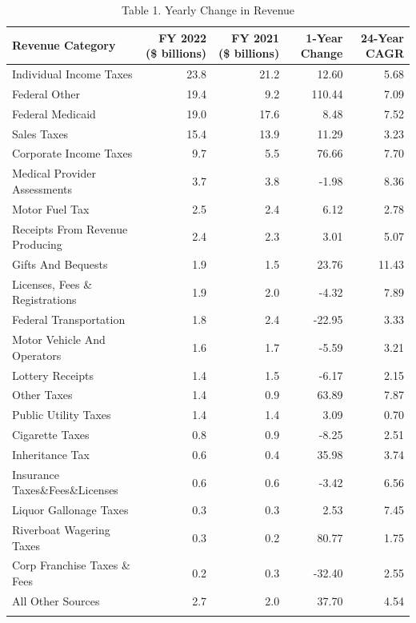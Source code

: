 \documentclass[
  letterpaper,
  DIV=11,
  numbers=noendperiod]{scrreport}
\begin{document}
\begin{table}

\caption{Table 1. Yearly Change in Revenue}
\centering
\begin{tabular}[t]{l|r|r|r|r}
\hline
Revenue Category & FY 2022 (\$ billions) & FY 2021 (\$ billions) & 1-Year Change & 24-Year CAGR\\
\hline
Individual Income Taxes & 23.8 & 21.2 & 12.60 & 5.68\\
\hline
Federal Other & 19.4 & 9.2 & 110.44 & 7.09\\
\hline
Federal Medicaid & 19.0 & 17.6 & 8.48 & 7.52\\
\hline
Sales Taxes & 15.4 & 13.9 & 11.29 & 3.23\\
\hline
Corporate Income Taxes & 9.7 & 5.5 & 76.66 & 7.70\\
\hline
Medical Provider Assessments & 3.7 & 3.8 & -1.98 & 8.36\\
\hline
Motor Fuel Tax & 2.5 & 2.4 & 6.12 & 2.78\\
\hline
Receipts From Revenue Producing & 2.4 & 2.3 & 3.01 & 5.07\\
\hline
Gifts And Bequests & 1.9 & 1.5 & 23.76 & 11.43\\
\hline
Licenses, Fees \& Registrations & 1.9 & 2.0 & -4.32 & 7.89\\
\hline
Federal Transportation & 1.8 & 2.4 & -22.95 & 3.33\\
\hline
Motor Vehicle And Operators & 1.6 & 1.7 & -5.59 & 3.21\\
\hline
Lottery Receipts & 1.4 & 1.5 & -6.17 & 2.15\\
\hline
Other Taxes & 1.4 & 0.9 & 63.89 & 7.87\\
\hline
Public Utility Taxes & 1.4 & 1.4 & 3.09 & 0.70\\
\hline
Cigarette Taxes & 0.8 & 0.9 & -8.25 & 2.51\\
\hline
Inheritance Tax & 0.6 & 0.4 & 35.98 & 3.74\\
\hline
Insurance Taxes\&Fees\&Licenses & 0.6 & 0.6 & -3.42 & 6.56\\
\hline
Liquor Gallonage Taxes & 0.3 & 0.3 & 2.53 & 7.45\\
\hline
Riverboat Wagering Taxes & 0.3 & 0.2 & 80.77 & 1.75\\
\hline
Corp Franchise Taxes \& Fees & 0.2 & 0.3 & -32.40 & 2.55\\
\hline
All Other Sources & 2.7 & 2.0 & 37.70 & 4.54\\
\hline
\cellcolor{gray}{\textcolor{black}{\textbf{Total}}} & \cellcolor{gray}{\textcolor{black}{\textbf{113.0}}} & \cellcolor{gray}{\textcolor{black}{\textbf{91.8}}} & \cellcolor{gray}{\textcolor{black}{\textbf{23.12}}} & \cellcolor{gray}{\textcolor{black}{\textbf{5.50}}}\\
\hline
\end{tabular}
\end{table}
\end{document}
